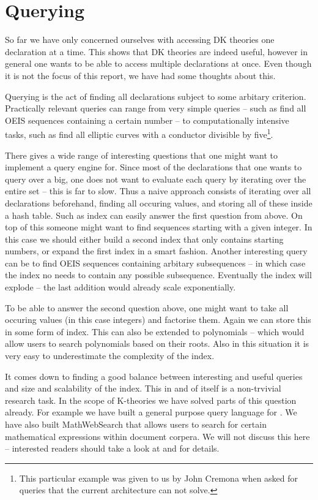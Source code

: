 \section{Querying}\label{sec:querying}

So far we have only concerned ourselves with accessing DK theories one declaration at a
time. This shows that DK theories are indeed useful, however in general one wants to be
able to access multiple declarations at once. Even though it is not the focus of this
report, we have had some thoughts about this.

Querying is the act of finding all declarations subject to some arbitary
criterion. Practically relevant queries can range from very simple queries -- such as find
all OEIS sequences containing a certain number -- to computationally intensive tasks, such
as find all elliptic curves with a conductor divisible by five\footnote{This particular
  example was given to us by John Cremona when asked for queries that the current
  architecture can not solve. }.

There gives a wide range of interesting questions that one might want to implement a query
engine for. Since most of the declarations that one wants to query over a big, one does
not want to evaluate each query by iterating over the entire set -- this is far to
slow. Thus a naive approach consists of iterating over all declarations beforehand,
finding all occuring values, and storing all of these inside a hash table. Such as index
can easily answer the first question from above. On top of this someone might want to find
sequences starting with a given integer. In this case we should either build a second
index that only contains starting numbers, or expand the first index in a smart
fashion. Another interesting query can be to find OEIS sequences containing arbitary
subsequences -- in which case the index no needs to contain any possible
subsequence. Eventually the index will explode -- the last addition would already scale
exponentially.

To be able to answer the second question above, one might want to take all occuring values
(in this case integers) and factorise them. Again we can store this in some form of
index. This can also be extended to polynomials -- which would allow users to search
polynomials based on their roots. Also in this situation it is very easy to underestimate
the complexity of the index.

It comes down to finding a good balance between interesting and useful queries and size
and scalability of the index. This in and of itself is a non-trvivial research task. In
the scope of K-theories we have solved parts of this question already. For example we have
built a general purpose query language for \MMT. We have also built MathWebSearch that
allows users to search for certain mathematical expressions within document corpera. We
will not discuss this here -- interested readers should take a look at \cite{Rabe:qlfml12}
and \cite{ODK-D6.1} for details.

